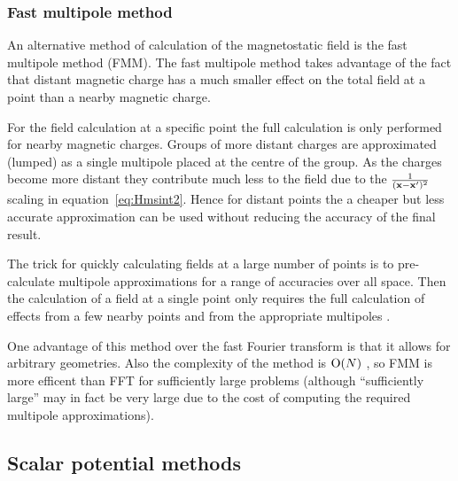 \subsubsection{Fast multipole method}
\label{sec:fast-mult-meth}

An alternative method of calculation of the magnetostatic field is the fast multipole method (FMM).
The fast multipole method takes advantage of the fact that distant magnetic charge has a much smaller effect on the total field at a point than a nearby magnetic charge.

For the field calculation at a specific point the full calculation is only performed for nearby magnetic charges.
Groups of more distant charges are approximated (lumped) as a single multipole placed at the centre of the group.
As the charges become more distant they contribute much less to the field due to the $\frac{1}{(\mathbf{x} - \mathbf{x}')^2}$ scaling in equation~\cref{eq:Hmsint2}.
Hence for distant points the a cheaper but less accurate approximation can be used without reducing the accuracy of the final result.

The trick for quickly calculating fields at a large number of points is to pre-calculate multipole approximations for a range of accuracies over all space.
Then the calculation of a field at a single point only requires the full calculation of effects from a few nearby points and from the appropriate multipoles \cite{Beatson1997}.

One advantage of this method over the fast Fourier transform is that it allows for arbitrary geometries.
Also the complexity of the method is $\text{O}{\left( N \right)}$ \cite{Chang2011}, so FMM is more efficent than FFT for sufficiently large problems (although ``sufficiently large'' may in fact be very large due to the cost of computing the required multipole approximations).


\subsection{Scalar potential methods}
\label{sec:magstat-field-calc-pote}

